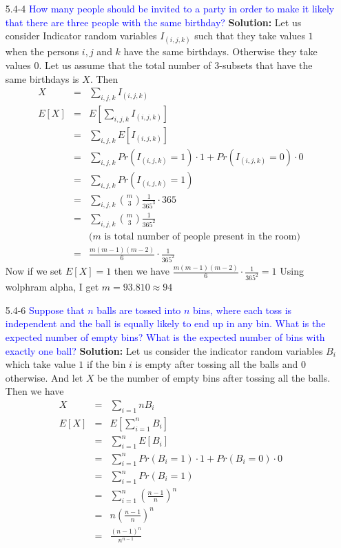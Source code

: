 \documentclass{article}
\begin{document}
\begin{enumerate}
\item[5.4-4] \textcolor{blue}{How many people should be invited to a party in order to make it likely that there are three people with the same birthday?}
\textbf{Solution:} Let us consider Indicator random variables $I_{(i,j,k)}$ such that they take values $1$ when the persons $i,j$ and $k$ have the same birthdays. Otherwise they take values $0$. Let us assume that the total number of $3$-subsets that have the same birthdays is $X$. Then 
\begin{eqnarray*}
X &=& \sum_{i,j,k}I_{(i,j,k)}\\
E\left[X\right] &=& E\left[\sum_{i,j,k}I_{(i,j,k)}\right]\\
&=& \sum_{i,j,k}E\left[I_{(i,j,k)}\right]\\
&=& \sum_{i,j,k}Pr(I_{(i,j,k)}=1)\cdot 1 + Pr(I_{(i,j,k)}=0)\cdot 0 \\ 
&=& \sum_{i,j,k}Pr(I_{(i,j,k)}=1)\\
&=& \sum_{i,j,k}\binom{m}{3}\frac{1}{365^3}\cdot365\\
&=& \sum_{i,j,k}\binom{m}{3}\frac{1}{365^2}\\
& & \text{($m$ is total number of people present in the room)}\\
&=& \frac{m(m-1)(m-2)}{6}\cdot\frac{1}{365^2}
\end{eqnarray*}
Now if we set $E\left[X\right] = 1$ then we have $\frac{m(m-1)(m-2)}{6}\cdot\frac{1}{365^2} = 1$
Using wolphram alpha, I get $m = 93.810 \approx 94$


\item[5.4-6] \textcolor{blue}{Suppose that $n$ balls are tossed into $n$ bins, where each toss is independent and the ball is equally likely to end up in any bin. What is the expected number of empty bins? What is the expected number of bins with exactly one ball?}
\textbf{Solution:} Let us consider the indicator random variables $B_i$ which take value $1$ if the bin $i$ is empty after tossing all the balls and $0$  otherwise. And let $X$ be the number of empty bins after tossing all the balls. Then we have
\begin{eqnarray*}
X &=& \sum_{i=1}{n} B_i\\
E\left[X\right] &=& E\left[\sum_{i=1}^{n} B_i \right]\\
&=& \sum_{i=1}^{n}E\left[ B_i \right]\\
&=& \sum_{i=1}^{n}Pr(B_i = 1)\cdot 1 + Pr(B_i = 0)\cdot 0\\
&=& \sum_{i=1}^{n}Pr(B_i = 1)\\
&=& \sum_{i=1}^{n}\left(\frac{n-1}{n}\right)^n\\
&=& n\left(\frac{n-1}{n}\right)^n\\
&=& \frac{\left(n-1\right)^n}{n^{n-1}}\\
\end{eqnarray*}


\end{enumerate}
\end{document}
